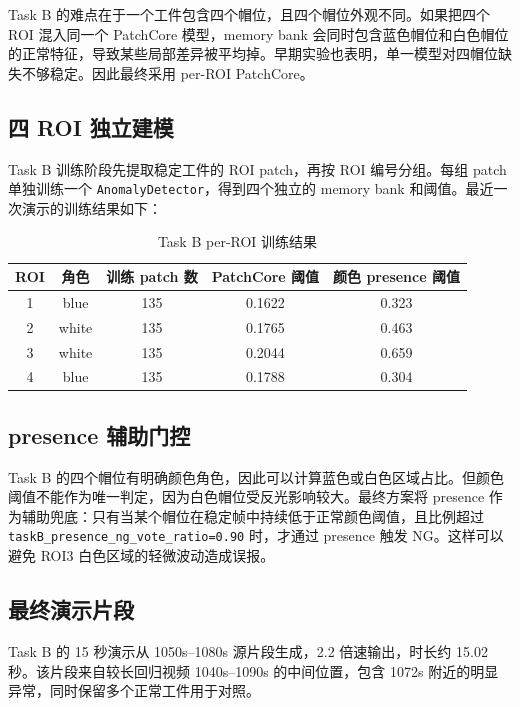 \documentclass[12pt,hyperref,a4paper,UTF8,fontset=fandol]{ctexart}
\begin{document}
Task B 的难点在于一个工件包含四个帽位，且四个帽位外观不同。如果把四个 ROI 混入同一个 PatchCore 模型，memory bank 会同时包含蓝色帽位和白色帽位的正常特征，导致某些局部差异被平均掉。早期实验也表明，单一模型对四帽位缺失不够稳定。因此最终采用 per-ROI PatchCore。

\subsection{四 ROI 独立建模}

Task B 训练阶段先提取稳定工件的 ROI patch，再按 ROI 编号分组。每组 patch 单独训练一个 \texttt{AnomalyDetector}，得到四个独立的 memory bank 和阈值。最近一次演示的训练结果如下：

\begin{table}[H]
    \centering
    \begin{tabular}{ccccc}
        \toprule
        ROI & 角色 & 训练 patch 数 & PatchCore 阈值 & 颜色 presence 阈值 \\
        \midrule
        1 & blue & 135 & 0.1622 & 0.323 \\
        2 & white & 135 & 0.1765 & 0.463 \\
        3 & white & 135 & 0.2044 & 0.659 \\
        4 & blue & 135 & 0.1788 & 0.304 \\
        \bottomrule
    \end{tabular}
    \caption{Task B per-ROI 训练结果}
\end{table}

\subsection{presence 辅助门控}

Task B 的四个帽位有明确颜色角色，因此可以计算蓝色或白色区域占比。但颜色阈值不能作为唯一判定，因为白色帽位受反光影响较大。最终方案将 presence 作为辅助兜底：只有当某个帽位在稳定帧中持续低于正常颜色阈值，且比例超过 \texttt{taskB\_presence\_ng\_vote\_ratio=0.90} 时，才通过 presence 触发 NG。这样可以避免 ROI3 白色区域的轻微波动造成误报。

\subsection{最终演示片段}

Task B 的 15 秒演示从 1050s--1080s 源片段生成，2.2 倍速输出，时长约 15.02 秒。该片段来自较长回归视频 1040s--1090s 的中间位置，包含 1072s 附近的明显异常，同时保留多个正常工件用于对照。
\end{document}
